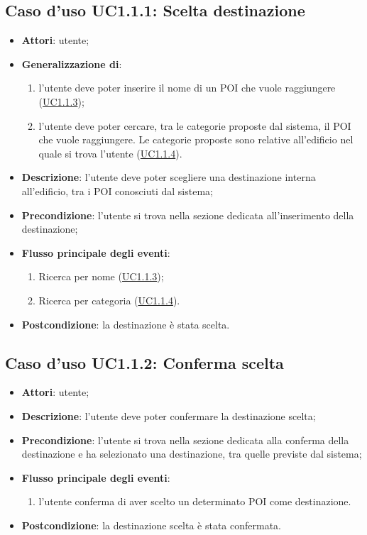 \documentclass[../AnalisiDeiRequisiti.tex]{subfiles}
\begin{document}
\subsection{Caso d'uso UC1.1.1: Scelta destinazione}
\begin{itemize}
	\item \textbf{Attori}: utente;
	
	\item \textbf{Generalizzazione di}:
	\begin{enumerate}
		\item l'utente deve poter inserire il nome di un POI che vuole raggiungere (\hyperlink{UC1.1.3}{UC1.1.3});
		\item l'utente deve poter cercare, tra le categorie proposte dal sistema, il POI che vuole raggiungere. Le categorie proposte sono relative all'edificio nel quale si trova l'utente (\hyperlink{UC1.1.4}{UC1.1.4}).
		
	\end{enumerate}
	\item \textbf{Descrizione}: l'utente deve poter scegliere una destinazione interna all'edificio, tra i POI conosciuti dal sistema; 
	\item \textbf{Precondizione}: l'utente si trova nella sezione dedicata all'inserimento della destinazione;
	
	\item \textbf{Flusso principale degli eventi}:
	\begin{enumerate}
		\item Ricerca per nome (\hyperlink{UC1.1.3}{UC1.1.3});
		\item Ricerca per categoria (\hyperlink{UC1.1.4}{UC1.1.4}).
		
	\end{enumerate}
	\item \textbf{Postcondizione}: la destinazione è stata scelta.
\end{itemize}
\hypertarget{UC1.1.2}{}
\subsection{Caso d'uso UC1.1.2: Conferma scelta}
\begin{itemize}
	\item \textbf{Attori}: utente;
	\item \textbf{Descrizione}: l'utente deve poter confermare la destinazione scelta; 
	\item \textbf{Precondizione}: l'utente si trova nella sezione dedicata alla conferma della destinazione e ha selezionato una destinazione, tra quelle previste dal sistema;
	
	\item \textbf{Flusso principale degli eventi}:
	\begin{enumerate}
		\item l'utente conferma di aver scelto un determinato POI come destinazione.
		
	\end{enumerate}
	\item \textbf{Postcondizione}: la destinazione scelta è stata confermata.
\end{itemize}
\hypertarget{UC1.1.3}{}
\end{document}

